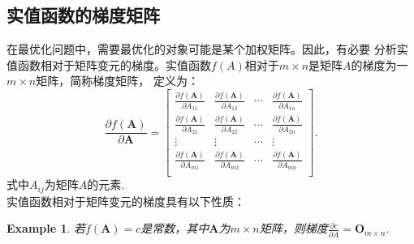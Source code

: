 \documentclass[UTF8,12pt]{ctexart}
\numberwithin{equation}{section}%
\newtheorem{example}{Example}[section]
\begin{document}
		\subsection{实值函数的梯度矩阵}
		在最优化问题中，需要最优化的对象可能是某个加权矩阵。因此，有必要 分析实值函数相对于矩阵变元的梯度。实值函数$f(A)$相对于$m\times n$是矩阵$A$的梯度为一$m\times n$矩阵，简称{\color{brown}梯度矩阵}， 定义为：
		\begin{equation}\label{eq:实值函数的梯度矩阵}
		\frac{\partial f(\bm{A}) }{\partial \bm{A}}	=
			\begin{bmatrix}
				\frac{\partial f(\bm{A}) }{\partial A_{11}}	&	\frac{\partial f(\bm{A}) }{\partial A_{12}} & 
				\cdots &
				\frac{\partial f(\bm{A}) }{\partial A_{1n}} \\
				\frac{\partial f(\bm{A}) }{\partial A_{21}}	&	
				\frac{\partial f(\bm{A}) }{\partial A_{22}} &
				 \cdots & 
				 \frac{\partial f(\bm{A}) }{\partial A_{2n}} \\
				\vdots& \vdots & \cdots & \vdots\\
				\frac{\partial f(\bm{A}) }{\partial A_{m1}}	&
				\frac{\partial f(\bm{A}) }{\partial A_{m2}} & 
				\cdots &
				\frac{\partial f(\bm{A}) }{\partial A_{mn}}\\
			\end{bmatrix}.
		\end{equation}
		\indent 式中$A_{ij}$为矩阵$A$的元素.
		\\\indent 实值函数相对于矩阵变元的梯度具有以下性质：
		\begin{example}
			若$f(\bm{A})=c$是常数，其中$\bm{A}$为$m\times n$矩阵，则梯度$\frac{\partial c }{\partial A}=\bm{O}_{m\times n}$.
		\end{example}
\end{document}

